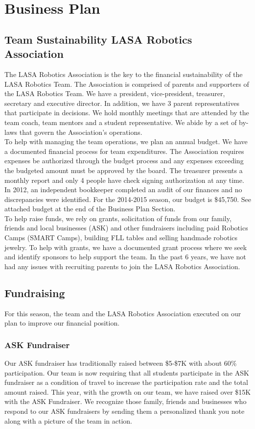 \section{Business Plan}
\subsection{Team Sustainability LASA Robotics Association}
The LASA Robotics Association is the key to the financial sustainability of the LASA Robotics Team.  The Association is comprised of parents and supporters of the LASA Robotics Team.   We have a president, vice-president, treasurer, secretary and executive director.  In addition, we have 3 parent representatives that participate in decisions.  We hold monthly meetings that are attended by the team coach, team mentors and a student representative. We abide by a set of by-laws that govern the Association’s operations.\\

To help with managing the team operations, we plan an annual budget. We have a documented financial process for team expenditures. The Association requires expenses be authorized through the budget process and any expenses exceeding the budgeted amount must be approved by the board. The treasurer presents a monthly report and only 4 people have check signing authorization at any time. In 2012, an independent bookkeeper completed an audit of our finances and no discrepancies were identified. For the 2014-2015 season, our budget is \$45,750.  See attached budget at the end of the Business Plan Section.\\

To help raise funds, we rely on grants, solicitation of funds from our family, friends and local businesses (ASK) and other fundraisers including paid Robotics Camps (SMART Camps), building FLL tables and selling handmade robotics jewelry.  To help with grants, we have a documented grant process where we seek and identify sponsors to help support the team. In the past 6 years, we have not had any issues with recruiting parents to join the LASA Robotics Association.

\subsection{Fundraising}
For this season, the team and the LASA Robotics Association executed on our plan to improve our financial position.

\subsubsection{ASK Fundraiser}
Our ASK fundraiser has traditionally raised between \$5-\$7K with about 60\% participation.  Our team is now requiring that all students participate in the ASK fundraiser as a condition of travel to increase the participation rate and the total amount raised.  This year, with the growth on our team, we have raised over \$15K with the ASK Fundraiser.  We recognize those family, friends and businesses who respond to our ASK fundraisers by sending them a personalized thank you note along with a picture of the team in action. 

